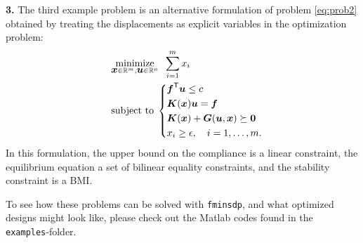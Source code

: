 \documentclass{article}
\newcommand{\bm}[1]{\mbox{\boldmath $#1$}}
\newcommand{\T}{\textsf{T}}
\begin{document}
\vskip2mm
\noindent\textbf{3.} 
The third example problem is an alternative formulation of problem \eqref{eq:prob2} obtained by treating the displacements as explicit variables in the optimization problem:
\begin{equation}\nonumber
\quad
	\begin{aligned}
	&	\underset{\bm{x}\in\mathbb{R}^{m},\bm{u}\in\mathbb{R}^{n}}{\mbox{minimize}} \;\; \sum_{i=1}^{m}x_{i} \\
	&	\mbox{subject to} \;
	\left\{
		\begin{aligned}
		  & \bm{f}^{\T}\bm{u} \leq c \\
		  & \bm{K}(\bm{x})\bm{u} = \bm{f} \\
			& \bm{K}(\bm{x}) + \bm{G}(\bm{u},\bm{x}) \succeq \bm{0} \\
			& x_{i} \geq \epsilon , \quad i=1,\ldots,m.
		\end{aligned}
		\right.
	\end{aligned}
\end{equation}
In this formulation, the upper bound on the compliance is a linear constraint, the equilibrium equation a set of bilinear equality constraints,
and the stability constraint is a BMI.

\vskip 5mm
\noindent To see how these problems can be solved with \texttt{fminsdp}, and what optimized designs might look like, please check out the Matlab codes found in the \texttt{examples}-folder.


\newpage


\end{document}
